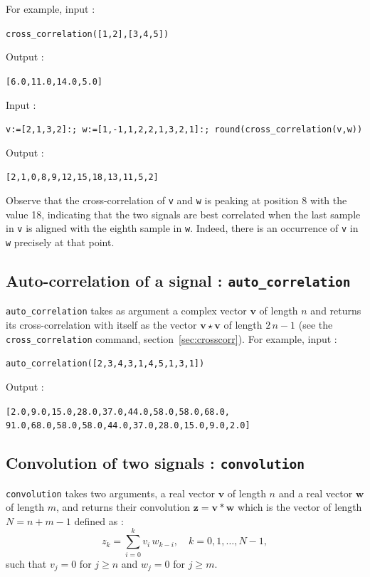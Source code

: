 \documentclass[a4paper,11pt]{book}
\begin{document}
For example, input :
\begin{center}
	\tt cross\_correlation([1,2],[3,4,5])
\end{center}
Output :
\begin{center}
	{\tt [6.0,11.0,14.0,5.0]}
\end{center}
Input :
\begin{center}
  \tt v:=[2,1,3,2]:; w:=[1,-1,1,2,2,1,3,2,1]:;
  round(cross\_correlation(v,w))
\end{center}
Output :
\begin{center}
  \tt [2,1,0,8,9,12,15,18,13,11,5,2]
\end{center}
Observe that the cross-correlation of {\tt v} and {\tt w} is peaking at position 8 with the value 18, indicating that the two signals are best correlated when the last sample in {\tt v} is aligned with the eighth sample in {\tt w}. Indeed, there is an occurrence of {\tt v} in {\tt w} precisely at that point.

\subsection{Auto-correlation of a signal : {\tt auto\_correlation}}
{\tt auto\_correlation} takes as argument a complex vector $ \mathbf{v} $ of length $ n $ and returns its cross-correlation with itself as the vector $ \mathbf{v}\star\mathbf{v} $ of length $ 2\,n-1 $ (see the {\tt cross\_correlation} command, section~\ref{sec:crosscorr}). For example, input :
\begin{center}
	{\tt auto\_correlation([2,3,4,3,1,4,5,1,3,1])}
\end{center}
Output :
\begin{center}
	{\tt [2.0,9.0,15.0,28.0,37.0,44.0,58.0,58.0,68.0,\\
		91.0,68.0,58.0,58.0,44.0,37.0,28.0,15.0,9.0,2.0]}
\end{center}

\subsection{Convolution of two signals : {\tt convolution}}
{\tt convolution} takes two arguments, a real vector $ \mathbf{v} $ of length $ n $ and a real vector $ \mathbf{w} $ of length $ m $, and returns their convolution $ \mathbf{z}=\mathbf{v}\ast\mathbf{w} $ which is the vector of length $ N=n+m-1 $ defined as :
\[ z_k=\sum_{i=0}^{k}v_i\,w_{k-i},\quad k=0,1,\dots,N-1, \]
such that $ v_j=0 $ for $ j\geq n $ and $ w_j=0 $ for $ j\geq m $.
\end{document}
